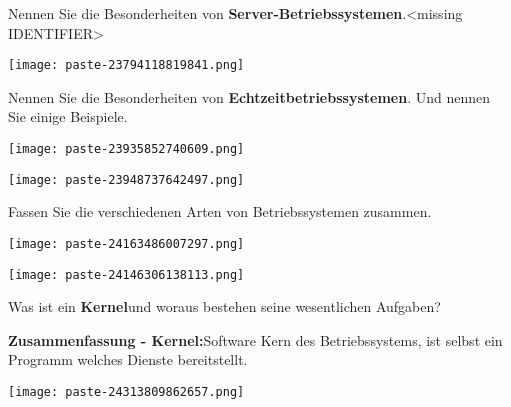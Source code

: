\documentclass{article}
\begin{document}
\begin{tcolorbox}[colback=white!10!white,colframe=lightgray!75!black,
  savelowerto=\jobname_ex.tex,breakable,enhanced,lines before break=40]

\justifying
Nennen Sie die Besonderheiten von \textbf{Server-Betriebssystemen}.<missing IDENTIFIER>

\tcblower

\justifying
\begin{center}
\texttt{[image: paste-23794118819841.png]}
\end{center}

\end{tcolorbox}
\begin{tcolorbox}[colback=white!10!white,colframe=lightgray!75!black,
  savelowerto=\jobname_ex.tex,breakable,enhanced,lines before break=40]

\justifying
Nennen Sie die Besonderheiten von \textbf{Echtzeitbetriebssystemen}. Und nennen Sie einige Beispiele.

\tcblower

\justifying
\begin{center}
\texttt{[image: paste-23935852740609.png]}
\end{center}
\begin{center}
\texttt{[image: paste-23948737642497.png]}
\end{center}

\end{tcolorbox}
\begin{tcolorbox}[colback=white!10!white,colframe=lightgray!75!black,
  savelowerto=\jobname_ex.tex,breakable,enhanced,lines before break=40]

\justifying
Fassen Sie die verschiedenen Arten von Betriebssystemen zusammen.

\tcblower

\justifying
\begin{center}
\texttt{[image: paste-24163486007297.png]}
\end{center}
\begin{center}
\texttt{[image: paste-24146306138113.png]}
\end{center}

\end{tcolorbox}
\begin{tcolorbox}[colback=white!10!white,colframe=lightgray!75!black,
  savelowerto=\jobname_ex.tex,breakable,enhanced,lines before break=40]

\justifying
Was ist ein \textbf{Kernel}und woraus bestehen seine wesentlichen Aufgaben?

\tcblower

\justifying
\textbf{Zusammenfassung - Kernel:}Software Kern des Betriebssystems, ist selbst ein Programm welches Dienste bereitstellt.\begin{center}
\texttt{[image: paste-24313809862657.png]}
\end{center}

\end{tcolorbox}
\end{document}
